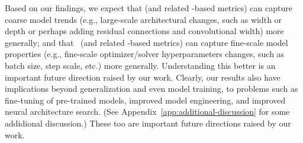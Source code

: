Based on our findings, we expect that \SPECTRALNORM (and related \SCALE-based metrics) can capture coarse model trends (e.g., large-scale architectural changes, such as width or depth or perhaps adding residual connections and convolutional width) more generally; and that \ALPHA~(and related \SHAPE-based metrics) can capture fine-scale model properties (e.g., fine-scale optimizer/solver hyperparameters changes, such as batch size, step scale, etc.) more generally.
Understanding this better is an important future direction raised by our work.
Clearly, our results also have implications beyond generalization and even model training, to problems such as fine-tuning of pre-trained models, improved model engineering, and improved neural architecture search.
(See Appendix~\ref{app:additional-discussion} for some addidional discussion.)
These too are important future directions raised by our work.




